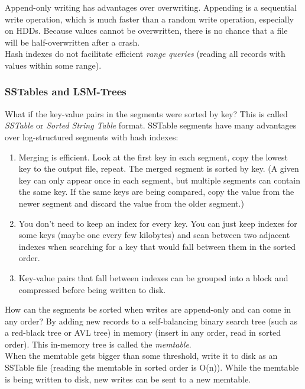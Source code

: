 \documentclass[12pt, titlepage]{article}
\begin{document}
Append-only writing has advantages over overwriting. Appending is a sequential write operation, which is much faster than a random write operation, especially on HDDs. Because values cannot be overwritten, there is no chance that a file will be half-overwritten after a crash. \\

Hash indexes do not facilitate efficient \textit{range queries} (reading all records with values within some range).

\subsubsection{SSTables and LSM-Trees}

What if the key-value pairs in the segments were sorted by key? This is called \textit{SSTable} or \textit{Sorted String Table} format. SSTable segments have many advantages over log-structured segments with hash indexes:

\begin{enumerate}
    \item Merging is efficient. Look at the first key in each segment, copy the lowest key to the output file, repeat. The merged segment is sorted by key. (A given key can only appear once in each segment, but multiple segments can contain the same key. If the same keys are being compared, copy the value from the newer segment and discard the value from the older segment.)
    \item You don't need to keep an index for every key. You can just keep indexes for some keys (maybe one every few kilobytes) and scan between two adjacent indexes when searching for a key that would fall between them in the sorted order.
    \item Key-value pairs that fall between indexes can be grouped into a block and compressed before being written to disk.
\end{enumerate}

How can the segments be sorted when writes are append-only and can come in any order? By adding new records to a self-balancing binary search tree (such as a red-black tree or AVL tree) in memory (insert in any order, read in sorted order). This in-memory tree is called the \textit{memtable}. \\

When the memtable gets bigger than some threshold, write it to disk as an SSTable file (reading the memtable in sorted order is O(n)). While the memtable is being written to disk, new writes can be sent to a new memtable. \\
\end{document}
